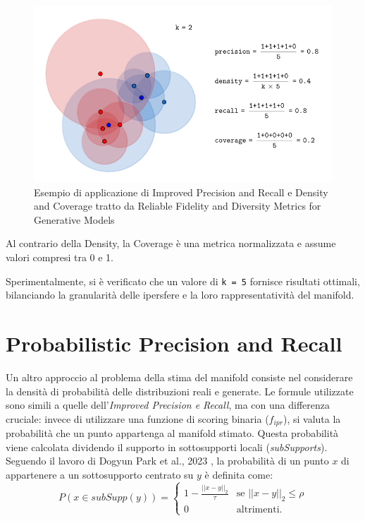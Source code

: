 \begin{figure}[htbp]
    \centering
    \includegraphics[width=\linewidth]{../images/prdc.png}
    \caption{Esempio di applicazione di Improved Precision and Recall e Density and Coverage tratto da Reliable Fidelity and Diversity Metrics for Generative Models \cite{3ReliableFidelityDiversityMetrics}}
\end{figure}

Al contrario della Density, la Coverage è una metrica normalizzata e assume valori compresi tra 0 e 1.

Sperimentalmente, si è verificato che un valore di \texttt{k = 5} fornisce risultati ottimali, bilanciando la granularità delle ipersfere e la loro rappresentatività del manifold.

\section{Probabilistic Precision and Recall}  
\label{sec:probabilistic-precision-and-recall}

Un altro approccio al problema della stima del manifold consiste nel considerare la densità di probabilità delle distribuzioni reali e generate. Le formule utilizzate sono simili a quelle dell'\textit{Improved Precision e Recall},
ma con una differenza cruciale: invece di utilizzare una funzione di scoring binaria (\(f_{ipr}\)), si valuta la probabilità che un punto appartenga al manifold stimato. 
Questa probabilità viene calcolata dividendo il supporto in sottosupporti locali (\textit{subSupports}). 
Seguendo il lavoro di Dogyun Park et al., 2023 \cite{4ProbabilisticPrecisionRecall}, la probabilità di un punto \(x\) di appartenere a un sottosupporto centrato su \(y\) è definita come:
\begin{equation}
    P(x \in subSupp(y)) = 
    \begin{cases}
        1 - \frac{||x - y||_2}{\tau} & \text{se } ||x - y||_2 \leq \rho \\
        0 & \text{altrimenti.}
    \end{cases}
\end{equation}

